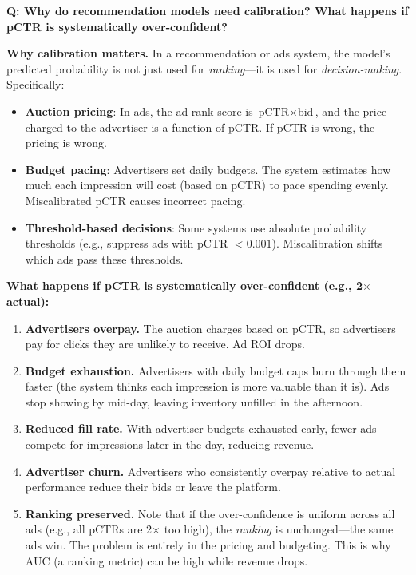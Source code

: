 \begin{interviewq}
\textbf{Q: Why do recommendation models need calibration? What happens if pCTR is systematically over-confident?}

 \quad {} \quad \badgefreq{\freqhigh}

\stronganswer

\textbf{Why calibration matters.} In a recommendation or ads system, the model's predicted probability is not just used for \textit{ranking}---it is used for \textit{decision-making}. Specifically:
\begin{itemize}
    \item \textbf{Auction pricing}: In ads, the ad rank score is $\text{pCTR} \times \text{bid}$, and the price charged to the advertiser is a function of pCTR. If pCTR is wrong, the pricing is wrong.
    \item \textbf{Budget pacing}: Advertisers set daily budgets. The system estimates how much each impression will cost (based on pCTR) to pace spending evenly. Miscalibrated pCTR causes incorrect pacing.
    \item \textbf{Threshold-based decisions}: Some systems use absolute probability thresholds (e.g., suppress ads with pCTR $< 0.001$). Miscalibration shifts which ads pass these thresholds.
\end{itemize}

\textbf{What happens if pCTR is systematically over-confident (e.g., 2$\times$ actual):}
\begin{enumerate}
    \item \textbf{Advertisers overpay.} The auction charges based on pCTR, so advertisers pay for clicks they are unlikely to receive. Ad ROI drops.
    \item \textbf{Budget exhaustion.} Advertisers with daily budget caps burn through them faster (the system thinks each impression is more valuable than it is). Ads stop showing by mid-day, leaving inventory unfilled in the afternoon.
    \item \textbf{Reduced fill rate.} With advertiser budgets exhausted early, fewer ads compete for impressions later in the day, reducing revenue.
    \item \textbf{Advertiser churn.} Advertisers who consistently overpay relative to actual performance reduce their bids or leave the platform.
    \item \textbf{Ranking preserved.} Note that if the over-confidence is uniform across all ads (e.g., all pCTRs are 2$\times$ too high), the \textit{ranking} is unchanged---the same ads win. The problem is entirely in the pricing and budgeting. This is why AUC (a ranking metric) can be high while revenue drops.
\end{enumerate}


\end{interviewq}
